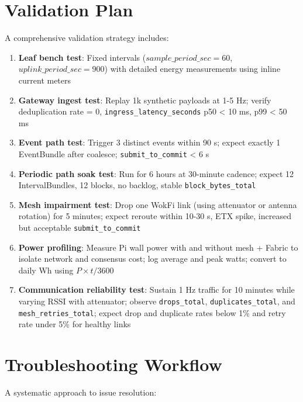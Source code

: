 \documentclass[12pt]{article}
\begin{document}
\section{Validation Plan}
\label{sec:validation}

A comprehensive validation strategy includes:

\begin{enumerate}
    \item \textbf{Leaf bench test}: Fixed intervals ($sample\_period\_sec=60$, $uplink\_period\_sec=900$) with detailed energy measurements using inline current meters
    \item \textbf{Gateway ingest test}: Replay 1k synthetic payloads at 1-5 Hz; verify deduplication rate = 0, \texttt{ingress\_latency\_seconds} p50 < 10 ms, p99 < 50 ms
    \item \textbf{Event path test}: Trigger 3 distinct events within 90 s; expect exactly 1 EventBundle after coalesce; \texttt{submit\_to\_commit} < 6 s
    \item \textbf{Periodic path soak test}: Run for 6 hours at 30-minute cadence; expect 12 IntervalBundles, 12 blocks, no backlog, stable \texttt{block\_bytes\_total}
    \item \textbf{Mesh impairment test}: Drop one WokFi link (using attenuator or antenna rotation) for 5 minutes; expect reroute within 10-30 s, ETX spike, increased but acceptable \texttt{submit\_to\_commit}
    \item \textbf{Power profiling}: Measure Pi wall power with and without mesh + Fabric to isolate network and consensus cost; log average and peak watts; convert to daily Wh using $P \times t / 3600$
    \item \textbf{Communication reliability test}: Sustain 1 Hz traffic for 10 minutes while varying RSSI with attenuator; observe \texttt{drops\_total}, \texttt{duplicates\_total}, and \texttt{mesh\_retries\_total}; expect drop and duplicate rates below 1\% and retry rate under 5\% for healthy links
\end{enumerate}

\section{Troubleshooting Workflow}
\label{sec:troubleshooting}

A systematic approach to issue resolution:
\end{document}
